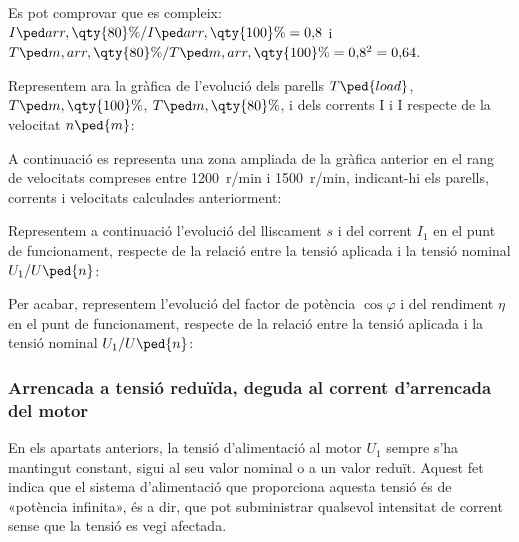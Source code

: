 \begin{exemple}
	Es pot comprovar que es compleix: $I\ped{arr,\qty{80}{\%}} / I\ped{arr,\qty{100}{\%}} = 0{,}8$ i $T\ped{m,arr,\qty{80}{\%}} / T\ped{m,arr,\qty{100}{\%}} = 0{,}8^2 = 0{,}64$.
		
 	Representem ara la gràfica de l'evolució dels parells $T\ped{load}$,  $T\ped{m,\qty{100}{\%}}$,  $T\ped{m,\qty{80}{\%}}$, i dels	corrents I i I respecte de la velocitat $n\ped{m}$:	
    \begin{center}
		\fontsize{10pt}{11pt}\selectfont
		
	\end{center}	

	\vspace{-2mm}
	A continuació es representa una zona ampliada de la gràfica anterior en el rang de velocitats compreses entre \qty{1200}{r/min} i  \qty{1500}{r/min}, indicant-hi els parells, corrents i velocitats calculades anteriorment:
	\begin{center}
		\fontsize{10pt}{11pt}\selectfont
		
	\end{center}
	Representem a continuació l'evolució del lliscament $s$ i del corrent $I_1$ en el punt de funcionament,  respecte de la relació entre la tensió aplicada i la tensió nominal $U_1/U\ped{n}$:
	\vspace{-4mm}
	\begin{center}
		
	\end{center}
	\vspace{-4mm}
	Per acabar, representem l'evolució del factor de potència $\cos\varphi$ i del rendiment $\eta$ en el punt de funcionament, respecte de la relació entre la tensió aplicada i la tensió nominal $U_1/U\ped{n}$:
	\vspace{-4mm}
	\begin{center}
		
	\end{center}
\end{exemple} 


\subsubsection{Arrencada a tensió reduïda, deguda al  corrent d'arrencada del motor}

En els apartats anteriors, la tensió d'alimentació al motor $U_1$ sempre s'ha mantingut constant, sigui al seu valor nominal o a un valor reduït. Aquest fet indica que el sistema d'alimentació que proporciona aquesta tensió és de «potència infinita», és a dir, que pot subministrar qualsevol intensitat de corrent sense que la tensió es vegi afectada.

